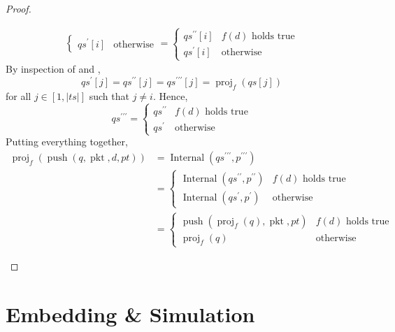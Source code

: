 \documentclass{amsart}
\DeclareMathOperator{\pkt}{\mathrm{pkt}}
\DeclareMathOperator{\push}{\mathrm{push}}
\DeclareMathOperator{\proj}{\mathrm{proj}}
\DeclareMathOperator{\Internal}{\mathrm{Internal}}
\theoremstyle{definition}
\begin{document}
\begin{proof}
\begin{itemize}
\begin{align*}
\begin{cases}
                    qs^\prime[i] & \text{otherwise}
                \end{cases}
                                                            =
                \begin{cases}
                    qs^{\prime\prime}[i] & f(d) \text{ holds true}\\
                    qs^\prime[i] & \text{otherwise}
                \end{cases}
            \end{align*}
            By inspection of  and ,
            $$qs^\prime[j] = qs^{\prime\prime}[j] = qs^{\prime\prime\prime}[j] = \proj_f(qs[j])$$
            for all $j \in [1, |ts|]$ such that $j \neq i$.
            Hence,
            $$
            qs^{\prime\prime\prime}
            =
            \begin{cases}
                qs^{\prime\prime} & f(d) \text{ holds true}\\
                qs^{\prime} & \text{otherwise}
            \end{cases}
            $$
            Putting everything together, 
            \begin{align*}
                \proj_f(\push(q, \pkt, d, pt)) &= \Internal(qs^{\prime\prime\prime}, p^{\prime\prime\prime})\\
                                               &=
                \begin{cases}
                    \Internal(qs^{\prime\prime}, p^{\prime\prime}) & f(d) \text{ holds true}\\
                    \Internal(qs^{\prime}, p^{\prime}) & \text{otherwise}
                \end{cases}\\
                                               &=
                \begin{cases}
                    \push(\proj_f(q), \pkt, pt) & f(d) \text{ holds true}\\
                    \proj_f(q) & \text{otherwise}
                \end{cases}
            \end{align*}
    \end{itemize}
\end{proof}

\section{Embedding \& Simulation}
\end{document}
